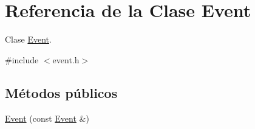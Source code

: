 \hypertarget{class_event}{}\section{Referencia de la Clase Event}
\label{class_event}


Clase \hyperlink{class_event}{Event}.  




{\ttfamily \#include $<$event.\+h$>$}

\subsection*{Métodos públicos}
\begin{DoxyCompactItemize}
\item 
\hyperlink{class_event_ac540d5e149dc8f0670ce49d1a1bc4d98}{Event} (const \hyperlink{class_event}{Event} \&)\hypertarget{class_event_ac540d5e149dc8f0670ce49d1a1bc4d98}{}\label{class_event_ac540d5e149dc8f0670ce49d1a1bc4d98}


\end{DoxyCompactItemize}
